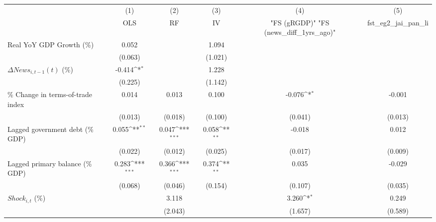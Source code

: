 {
\def\sym#1{\ifmmode^{#1}\else\(^{#1}\)\fi}
\begin{tabular}{l*{5}{c}}
\toprule
                    &\multicolumn{1}{c}{(1)}&\multicolumn{1}{c}{(2)}&\multicolumn{1}{c}{(3)}&\multicolumn{1}{c}{(4)}&\multicolumn{1}{c}{(5)}\\
                    &\multicolumn{1}{c}{OLS}&\multicolumn{1}{c}{RF}&\multicolumn{1}{c}{IV}&\multicolumn{1}{c}{ "FS (gRGDP)"  "FS (news_diff_1yrs_ago)" }&\multicolumn{1}{c}{fst_eg2_jai_pan_li}\\
\midrule
Real YoY GDP Growth (\%)&       0.052         &                     &       1.094         &                     &                     \\
                    &     (0.063)         &                     &     (1.021)         &                     &                     \\
\addlinespace
$ \Delta News_{i,t-1}(t)$ (\%)&      -0.414\sym{*}  &                     &       1.228         &                     &                     \\
                    &     (0.225)         &                     &     (1.142)         &                     &                     \\
\addlinespace
\% Change in terms-of-trade index&       0.014         &       0.013         &       0.100         &      -0.076\sym{*}  &      -0.001         \\
                    &     (0.013)         &     (0.018)         &     (0.100)         &     (0.041)         &     (0.013)         \\
\addlinespace
Lagged government debt (\% GDP)&       0.055\sym{**} &       0.047\sym{***}&       0.058\sym{**} &      -0.018         &       0.012         \\
                    &     (0.022)         &     (0.012)         &     (0.025)         &     (0.017)         &     (0.009)         \\
\addlinespace
Lagged primary balance (\% GDP)&       0.283\sym{***}&       0.366\sym{***}&       0.374\sym{**} &       0.035         &      -0.029         \\
                    &     (0.068)         &     (0.046)         &     (0.154)         &     (0.107)         &     (0.035)         \\
\addlinespace
$ Shock_{i,t}$ (\%) &                     &       3.118         &                     &       3.260\sym{*}  &       0.249         \\
                    &                     &     (2.043)         &                     &     (1.657)         &     (0.589)         \\

\end{tabular}}
